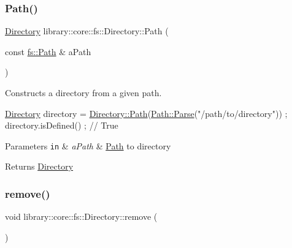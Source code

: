 \subsubsection{\texorpdfstring{Path()}{Path()}}
{\footnotesize\ttfamily \hyperlink{classlibrary_1_1core_1_1fs_1_1_directory}{Directory} library\+::core\+::fs\+::\+Directory\+::\+Path (\begin{DoxyParamCaption}\item[{const \hyperlink{classlibrary_1_1core_1_1fs_1_1_path}{fs\+::\+Path} \&}]{a\+Path }\end{DoxyParamCaption})\hspace{0.3cm}{\ttfamily [static]}}



Constructs a directory from a given path. 


\begin{DoxyCode}
\hyperlink{classlibrary_1_1core_1_1fs_1_1_directory_a3ec39f6cad19a81d520e9a1f2d8bb1f7}{Directory} directory = \hyperlink{classlibrary_1_1core_1_1fs_1_1_directory_ae906e33e4659219cf296dd314c7726b8}{Directory::Path}(\hyperlink{classlibrary_1_1core_1_1fs_1_1_path_a6ba644b6609507e724c217bf2020f5ae}{Path::Parse}(\textcolor{stringliteral}{"/path/to/directory"}))
       ;
directory.isDefined() ; \textcolor{comment}{// True}
\end{DoxyCode}



\begin{DoxyParams}[1]{Parameters}
\mbox{\tt in}  & {\em a\+Path} & \hyperlink{classlibrary_1_1core_1_1fs_1_1_path}{Path} to directory \\
\hline
\end{DoxyParams}
\begin{DoxyReturn}{Returns}
\hyperlink{classlibrary_1_1core_1_1fs_1_1_directory}{Directory} 
\end{DoxyReturn}
\mbox{\label{classlibrary_1_1core_1_1fs_1_1_directory_a8392a637e3b8cc07f55c0bc2850fb42b}} 
\subsubsection{\texorpdfstring{remove()}{remove()}}
{\footnotesize\ttfamily void library\+::core\+::fs\+::\+Directory\+::remove (\begin{DoxyParamCaption}{ }\end{DoxyParamCaption})}




